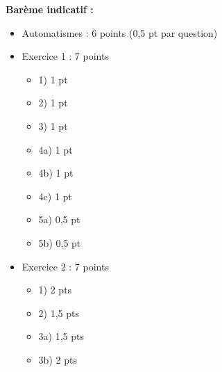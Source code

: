 \documentclass[a4paper,12pt]{article}
\begin{document}
\begin{enumerate}
\begin{center}
\end{center}

\end{enumerate}

\vspace{1cm}

\textbf{Barème indicatif :}
\begin{itemize}
\item Automatismes : 6 points (0,5 pt par question)
\item Exercice 1 : 7 points
  \begin{itemize}
  \item 1) 1 pt
  \item 2) 1 pt
  \item 3) 1 pt
  \item 4a) 1 pt
  \item 4b) 1 pt
  \item 4c) 1 pt
  \item 5a) 0,5 pt
  \item 5b) 0,5 pt
  \end{itemize}
\item Exercice 2 : 7 points
  \begin{itemize}
  \item 1) 2 pts
  \item 2) 1,5 pts
  \item 3a) 1,5 pts
  \item 3b) 2 pts
  \end{itemize}
\end{itemize}
\end{document}
